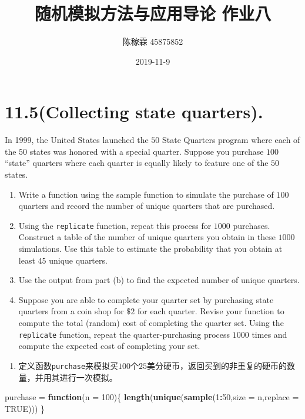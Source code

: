 \documentclass[]{article}
\title{随机模拟方法与应用导论 作业八}
\author{陈稼霖 45875852}
\date{2019-11-9}
\newenvironment{Shaded}{\begin{snugshade}}{\end{snugshade}}
\newcommand{\ControlFlowTok}[1]{\textcolor[rgb]{0.13,0.29,0.53}{\textbf{#1}}}
\newcommand{\DataTypeTok}[1]{\textcolor[rgb]{0.13,0.29,0.53}{#1}}
\newcommand{\DecValTok}[1]{\textcolor[rgb]{0.00,0.00,0.81}{#1}}
\newcommand{\KeywordTok}[1]{\textcolor[rgb]{0.13,0.29,0.53}{\textbf{#1}}}
\newcommand{\NormalTok}[1]{#1}
\newcommand{\OperatorTok}[1]{\textcolor[rgb]{0.81,0.36,0.00}{\textbf{#1}}}
\newcommand{\OtherTok}[1]{\textcolor[rgb]{0.56,0.35,0.01}{#1}}
\newcommand{\StringTok}[1]{\textcolor[rgb]{0.31,0.60,0.02}{#1}}
\providecommand{\tightlist}{%
  \setlength{\itemsep}{0pt}\setlength{\parskip}{0pt}}
\begin{document}
\maketitle

\hypertarget{collecting-state-quarters.}{%
\section{11.5(Collecting state
quarters).}\label{collecting-state-quarters.}}

In 1999, the United States launched the \(50\) State Quarters program
where each of the \(50\) states was honored with a special quarter.
Suppose you purchase \(100\) ``state'' quarters where each quarter is
equally likely to feature one of the \(50\) states.

\begin{enumerate}
\def\labelenumi{\alph{enumi}.}
\tightlist
\item
  Write a function using the sample function to simulate the purchase of
  \(100\) quarters and record the number of unique quarters that are
  purchased.
\item
  Using the \texttt{replicate} function, repeat this process for
  \(1000\) purchases. Construct a table of the number of unique quarters
  you obtain in these \(1000\) simulations. Use this table to estimate
  the probability that you obtain at least \(45\) unique quarters.
\item
  Use the output from part (b) to find the expected number of unique
  quarters.
\item
  Suppose you are able to complete your quarter set by purchasing state
  quarters from a coin shop for \(\$2\) for each quarter. Revise your
  function to compute the total (random) cost of completing the quarter
  set. Using the \texttt{replicate} function, repeat the
  quarter-purchasing process \(1000\) times and compute the expected
  cost of completing your set.
\end{enumerate}

\begin{enumerate}
\def\labelenumi{\alph{enumi}.}
\tightlist
\item
  定义函数\texttt{purchase}来模拟买\(100\)个\(25\)美分硬币，返回买到的非重复的硬币的数量，并用其进行一次模拟。
\end{enumerate}

\begin{Shaded}
\begin{Highlighting}[]
\NormalTok{purchase =}\StringTok{ }\ControlFlowTok{function}\NormalTok{(}\DataTypeTok{n =} \DecValTok{100}\NormalTok{)\{}
  \KeywordTok{length}\NormalTok{(}\KeywordTok{unique}\NormalTok{(}\KeywordTok{sample}\NormalTok{(}\DecValTok{1}\OperatorTok{:}\DecValTok{50}\NormalTok{,}\DataTypeTok{size =}\NormalTok{ n,}\DataTypeTok{replace =} \OtherTok{TRUE}\NormalTok{)))}
\NormalTok{\}}
\end{Highlighting}
\end{Shaded}
\end{document}
